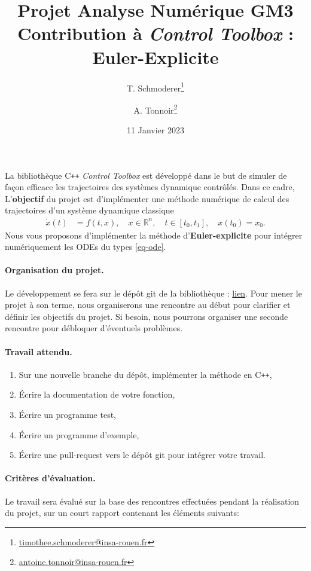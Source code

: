 \documentclass[a4paper, 12pt]{article}
\title{Projet Analyse Numérique GM3 \\ {\Large Contribution à \emph{Control Toolbox} : Euler-Explicite}}
\author{T. Schmoderer\thanks{\href{mailto:timothee.schmoderer@insa-rouen.fr}{timothee.schmoderer@insa-rouen.fr}} \and A. Tonnoir\thanks{\href{mailto:antoine.tonnoir@insa-rouen.fr}{antoine.tonnoir@insa-rouen.fr}}}
\date{11 Janvier 2023}
\begin{document}
\maketitle

    La bibliothèque C\texttt{++} \emph{Control Toolbox} est développé dans le but de simuler de façon efficace les trajectoires des systèmes dynamique contrôlés. Dans ce cadre, L'\textbf{objectif} du projet est d'implémenter une méthode numérique de calcul des trajectoires d'un système dynamique classique 
    \begin{align}\label{eq-ode}
        \dot{x}(t) &= f(t,x), \quad x\in \mathbb{R}^n, \quad t\in[t_0,t_1],\quad x(t_0)=x_0.
    \end{align}
    \noindent
    Nous vous proposons d'implémenter la méthode d'\textbf{Euler-explicite} pour intégrer numériquement les ODEs du types \cref{eq-ode}.

\paragraph{Organisation du projet.}
    Le développement se fera sur le dépôt git de la bibliothèque : \href{https://github.com/tschmoderer/control-toolbox}{lien}. Pour mener le projet à son terme, nous organiserons une rencontre au début pour clarifier et définir les objectifs du projet. Si besoin, nous pourrons organiser une seconde rencontre pour débloquer d'éventuels problèmes. 

\paragraph{Travail attendu.}
    \begin{enumerate}
        \item Sur une nouvelle branche du dépôt, implémenter la méthode en C\texttt{++}, 
        \item Écrire la documentation de votre fonction, 
        \item Écrire un programme test,
        \item Écrire un programme d'exemple, 
        \item Écrire une pull-request vers le dépôt git pour intégrer votre travail. 
    \end{enumerate} 

\paragraph{Critères d'évaluation.}Le travail sera évalué sur la base des rencontres effectuées pendant la réalisation du projet, sur un court rapport contenant les éléments suivants: 
\end{document}
